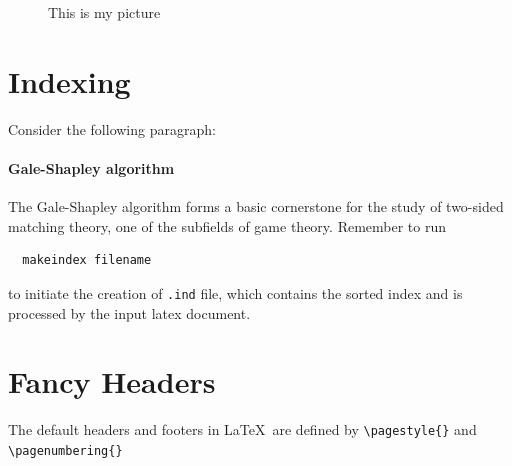 \documentclass[a4paper,11pt]{article}
\begin{document}
\begin{figure}[!htbp]
  \centering
  \caption{This is my picture}
  \label{}
\end{figure}

\section{Indexing}
Consider the following paragraph:
\paragraph{Gale-Shapley algorithm}
The Gale-Shapley
algorithm
forms a basic cornerstone for the study of two-sided
matching theory,
one of the subfields of
game theory.
\bigbreak
Remember to run
\begin{verbatim}
  makeindex filename
\end{verbatim}
to initiate the creation of \verb+.ind+ file, which contains the
sorted index and is processed by the input latex document.
\printindex

\section{Fancy Headers}
The default headers and footers in \LaTeX~are defined
by \verb+\pagestyle{}+ and \verb+\pagenumbering{}+
\end{document}
